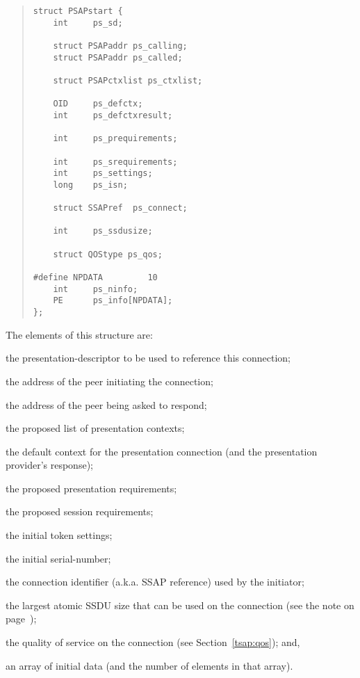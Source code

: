 \begin{quote}\small\begin{verbatim}
struct PSAPstart {
    int     ps_sd;

    struct PSAPaddr ps_calling;
    struct PSAPaddr ps_called;

    struct PSAPctxlist ps_ctxlist;

    OID     ps_defctx;
    int     ps_defctxresult;

    int     ps_prequirements;

    int     ps_srequirements;
    int     ps_settings;
    long    ps_isn;

    struct SSAPref  ps_connect;

    int     ps_ssdusize;

    struct QOStype ps_qos;

#define NPDATA         10
    int     ps_ninfo;
    PE      ps_info[NPDATA];
};
\end{verbatim}\end{quote}
The elements of this structure are:\label{PSAPstart}
\begin{describe}
\item[\verb"ps\_sd":] the presentation-descriptor to be used to reference this
connection;

\item[\verb"ps\_calling":] the address of the peer initiating the connection;

\item[\verb"ps\_called":] the address of the peer being asked to respond;

\item[\verb"ps\_ctxlist":] the proposed list of presentation contexts;

\item[\verb"ps\_defctx"/\verb"ps\_defctxresult":] the default context
for the presentation connection
(and the presentation provider's response);

\item[\verb"ps\_prequirements":] the proposed presentation requirements;

\item[\verb"ps\_srequirements":] the proposed session requirements;

\item[\verb"ps\_settings":] the initial token settings;

\item[\verb"ps\_isn":] the initial serial-number;

\item[\verb"ps\_connect":] the connection identifier (a.k.a. SSAP reference)
used by the initiator;

\item[\verb"ps\_ssdusize":] the largest atomic SSDU size that can be used on
the connection (see the note on page~\pageref{SSDU:atomic});

\item[\verb"ps\_qos":] the quality of service on the connection
(see Section~\ref{tsap:qos});
and,

\item[\verb"ps\_info"/\verb"ps\_ninfo":] an array of initial data
(and the number of elements in that array).
\end{describe}
